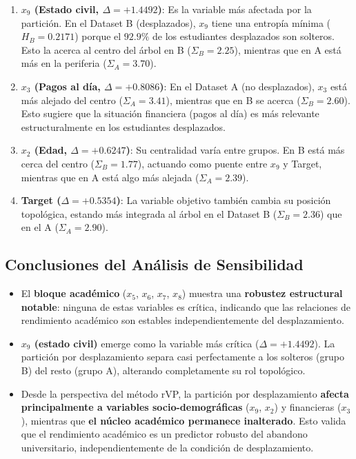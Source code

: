 \documentclass[12pt,a4paper]{article}
\begin{document}
\begin{enumerate}
    \item \textbf{$x_9$ (Estado civil, $\Delta = +1.4492$)}: Es la variable más afectada por la partición. En el Dataset B (desplazados), $x_9$ tiene una entropía mínima ($H_B = 0.2171$) porque el $92.9\%$ de los estudiantes desplazados son solteros. Esto la acerca al centro del árbol en B ($\Sigma_B = 2.25$), mientras que en A está más en la periferia ($\Sigma_A = 3.70$).

    \item \textbf{$x_3$ (Pagos al día, $\Delta = +0.8086$)}: En el Dataset A (no desplazados), $x_3$ está más alejado del centro ($\Sigma_A = 3.41$), mientras que en B se acerca ($\Sigma_B = 2.60$). Esto sugiere que la situación financiera (pagos al día) es más relevante estructuralmente en los estudiantes desplazados.

    \item \textbf{$x_2$ (Edad, $\Delta = +0.6247$)}: Su centralidad varía entre grupos. En B está más cerca del centro ($\Sigma_B = 1.77$), actuando como puente entre $x_9$ y Target, mientras que en A está algo más alejada ($\Sigma_A = 2.39$).

    \item \textbf{Target ($\Delta = +0.5354$)}: La variable objetivo también cambia su posición topológica, estando más integrada al árbol en el Dataset B ($\Sigma_B = 2.36$) que en el A ($\Sigma_A = 2.90$).
\end{enumerate}

\subsection{Conclusiones del Análisis de Sensibilidad}

\begin{itemize}
    \item El \textbf{bloque académico} ($x_5$, $x_6$, $x_7$, $x_8$) muestra una \textbf{robustez estructural notable}: ninguna de estas variables es crítica, indicando que las relaciones de rendimiento académico son estables independientemente del desplazamiento.

    \item \textbf{$x_9$ (estado civil)} emerge como la variable más crítica ($\Delta = +1.4492$). La partición por desplazamiento separa casi perfectamente a los solteros (grupo B) del resto (grupo A), alterando completamente su rol topológico.

    \item Desde la perspectiva del método rVP, la partición por desplazamiento \textbf{afecta principalmente a variables socio-demográficas} ($x_9$, $x_2$) y financieras ($x_3$), mientras que \textbf{el núcleo académico permanece inalterado}. Esto valida que el rendimiento académico es un predictor robusto del abandono universitario, independientemente de la condición de desplazamiento.
\end{itemize}

\newpage
\end{document}
